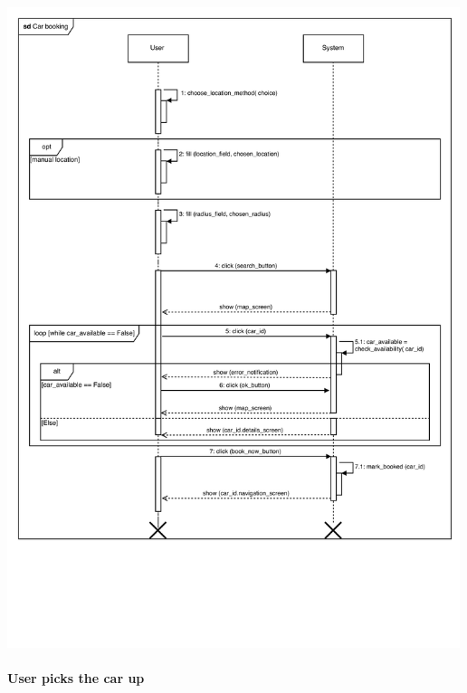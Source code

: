 \documentclass[]{article}
\let\oldparagraph\paragraph
\renewcommand{\paragraph}[1]{\oldparagraph{#1}\mbox{}}
\begin{document}
\centerline{\includegraphics[width=5.20833in]{./FlowDiagrams/CarBookingSD.png}}\newpage

\paragraph{User picks the car up}\label{user-picks-the-car-up}
\end{document}
